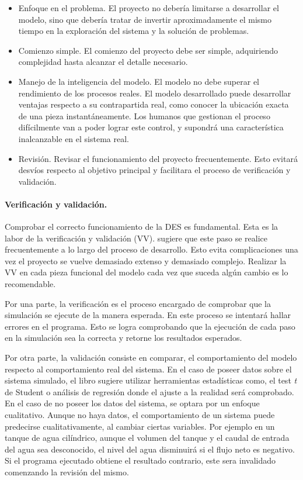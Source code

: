 \begin{itemize}
	\item Enfoque en el problema. El proyecto no debería limitarse a desarrollar el modelo,
		sino que debería tratar de invertir aproximadamente el mismo tiempo
		en la exploración del sistema y la solución de problemas.
	\item Comienzo simple. El comienzo del proyecto debe ser simple,
		adquiriendo complejidad hasta alcanzar el detalle necesario.
	\item Manejo de la inteligencia del modelo.
		El modelo no debe superar el rendimiento de los procesos reales.
		El modelo desarrollado puede desarrollar ventajas respecto a su contrapartida real,
		como conocer la ubicación exacta de una pieza instantáneamente.
		Los humanos que gestionan el proceso difícilmente van a poder lograr este control,
		y supondrá una característica inalcanzable en el sistema real.
	\item Revisión. Revisar el funcionamiento del proyecto frecuentemente.
		Esto evitará desvíos respecto al objetivo principal
		y facilitara el proceso de verificación y validación.
\end{itemize}
\paragraph{Verificación y validación.}

Comprobar el correcto funcionamiento de la DES es fundamental.
Esta es la labor de la verificación y validación (VV).
\citet{banks1998handbook} sugiere que este paso se realice
frecuentemente a lo largo del proceso de desarrollo.
Esto evita complicaciones una vez el proyecto se vuelve demasiado extenso y demasiado complejo.
Realizar la VV en cada pieza funcional del modelo
cada vez que suceda algún cambio es lo recomendable.

Por una parte, la verificación es el proceso encargado de
comprobar que la simulación se ejecute de la manera esperada.
En este proceso se intentará hallar errores en el programa.
Esto se logra comprobando que la ejecución de cada paso
en la simulación sea la correcta y retorne los resultados esperados.

Por otra parte, la validación consiste en comparar,
el comportamiento del modelo respecto al comportamiento real del sistema.
En el caso de poseer datos sobre el sistema simulado,
el libro sugiere utilizar herramientas estadísticas como,
el test \textit{t} de Student o
análisis de regresión donde el ajuste a la realidad será comprobado.
En el caso de no poseer los datos del sistema,
se optara por un enfoque cualitativo.
Aunque no haya datos, el comportamiento de un sistema
puede predecirse cualitativamente, al cambiar ciertas variables.
Por ejemplo en un tanque de agua cilíndrico,
aunque el volumen del tanque y el caudal de entrada del agua sea desconocido,
el nivel del agua disminuirá si el flujo neto es negativo.
Si el programa ejecutado obtiene el resultado contrario,
este sera invalidado comenzando la revisión del mismo.

